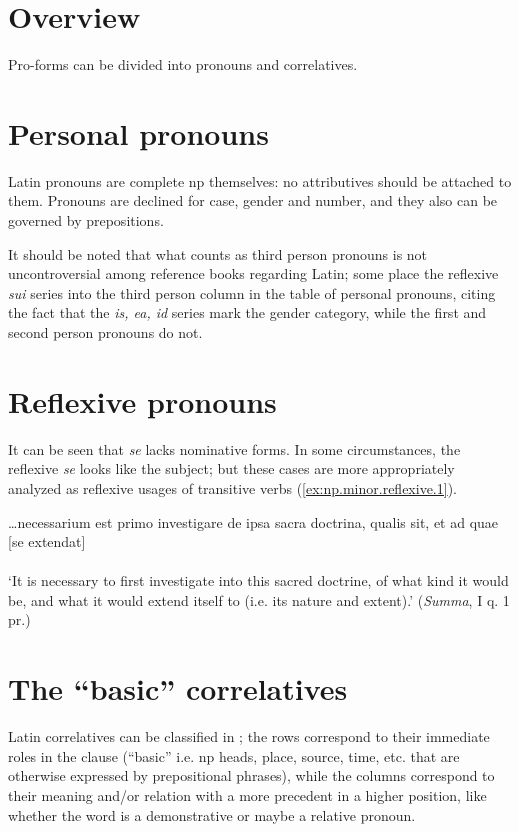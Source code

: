 \documentclass[a4paper, oneside, 12pt]{report}
\newcommand{\form}[1]{\emph{#1}}
\newcommand{\translate}[1]{`#1'}
\newcommand{\literature}[1]{\textit{#1}}
\begin{document}
\section{Overview}

Pro-forms can be divided into pronouns and correlatives.


\section{Personal pronouns}

Latin pronouns are complete \acs{np} themselves:
no attributives should be attached to them. 
Pronouns are declined for case, gender and number,
and they also can be governed by prepositions.

It should be noted that what counts as third person pronouns 
is not uncontroversial among reference books regarding Latin; 
some place the reflexive \form{sui} series into the third person column 
in the table of personal pronouns, 
citing the fact that the \form{is, ea, id} series mark the gender category, 
while the first and second person pronouns do not.


\section{Reflexive pronouns}

It can be seen that \form{se} lacks nominative forms.
In some circumstances, 
the reflexive \form{se} looks like the subject;
but these cases are more appropriately analyzed 
as reflexive usages of transitive verbs
(\ref{ex:np.minor.reflexive.1}).

\begin{exe}
    \ex\label{ex:np.minor.reflexive.1} \gll \dots necessarium est primo investigare de ipsa sacra doctrina, 
    qualis sit, et ad quae [se extendat]  \\
    \\
    \glt \translate{It is necessary to first investigate into this sacred doctrine, 
    of what kind it would be, 
    and what it would extend itself to (i.e. its nature and extent).} (\literature{Summa}, I q. 1 pr.)
\end{exe}

\section{The ``basic'' correlatives}

Latin correlatives can be classified in ;
the rows correspond to their immediate roles in the clause 
(``basic'' i.e. \ac{np} heads, 
place, source, time, etc. that are otherwise expressed by prepositional phrases),
while the columns correspond to their meaning and/or 
relation with a more precedent in a higher position,
like whether the word is a demonstrative 
or maybe a relative pronoun. 
\end{document}
